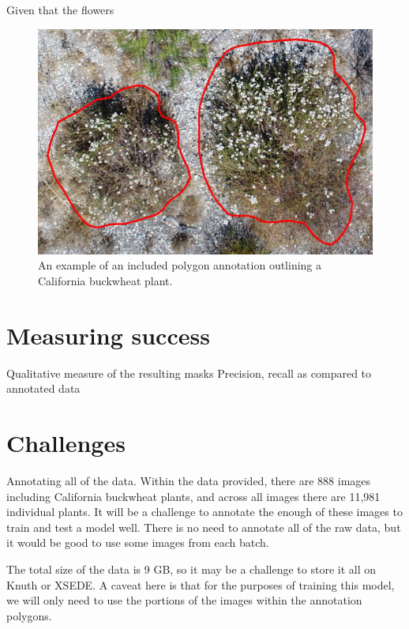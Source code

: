 \documentclass[10pt,twocolumn,letterpaper]{article}
\begin{document}
Given that the flowers 

\begin{figure}[t]
  \centering
   \includegraphics[width=0.9\linewidth]{annotation.jpg}
   \caption{An example of an included polygon annotation outlining a California buckwheat plant.}
   \label{fig:annotation}
\end{figure}

\section{Measuring success}

Qualitative measure of the resulting masks
Precision, recall as compared to annotated data

\section{Challenges}

Annotating all of the data. Within the data provided, there are 888 images including California buckwheat plants, and across all images there are 11,981 individual plants. It will be a challenge to annotate the enough of these images to train and test a model well. There is no need to annotate all of the raw data, but it would be good to use some images from each batch.

The total size of the data is 9 GB, so it may be a challenge to store it all on Knuth or XSEDE. A caveat here is that for the purposes of training this model, we will only need to use the portions of the images within the annotation polygons.

{\small


}
\end{document}
